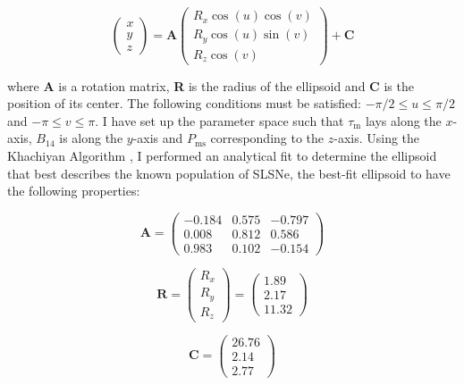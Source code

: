 \begin{equation}
\label{eq:Ellipsoid}
\left( \begin{matrix}
x \\
y \\
z
\end{matrix} \right)
=
\mathbf{A}
\left( \begin{matrix}
R_x\cos(u)\cos(v) \\
R_y\cos(u)\sin(v) \\
R_z\cos(v)
\end{matrix} \right)
+ \mathbf{C}
\end{equation}

\noindent where \textbf{A} is a rotation matrix, \textbf{R} is the radius of the ellipsoid and \textbf{C} is the position of its center. The following conditions must be satisfied: $-\pi /2 \leq u \leq \pi /2$ and $-\pi \leq v \leq \pi$. I have set up the parameter space such that $\tau_\mathrm{m}$ lays along the $x$-axis, $B_{14}$ is along the $y$-axis and $P_{\mathrm{ms}}$ corresponding to the $z$-axis. Using the Khachiyan Algorithm \citep{Aspvall1980,Khachiyan1980}, I performed an analytical fit to determine the ellipsoid that best describes the known population of SLSNe,  the best-fit ellipsoid to have the following properties:

\begin{equation}
\label{eq:A}
\mathbf{A} =
\left( \begin{matrix}
-0.184 & 0.575 & -0.797\\
 0.008 & 0.812 & 0.586\\
0.983 & 0.102 & -0.154
\end{matrix} \right)
\end{equation}

\begin{equation}
\label{eq:R}
\mathbf{R} =
\left( \begin{matrix}
R_x \\
R_y \\
R_z
\end{matrix} \right)
=
\left( \begin{matrix}
1.89\\
2.17\\
11.32
\end{matrix} \right)
\end{equation}

\begin{equation}
\label{eq:C}
\mathbf{C} =
\left( \begin{matrix}
26.76 \\
2.14\\
2.77
\end{matrix} \right)
\end{equation}

